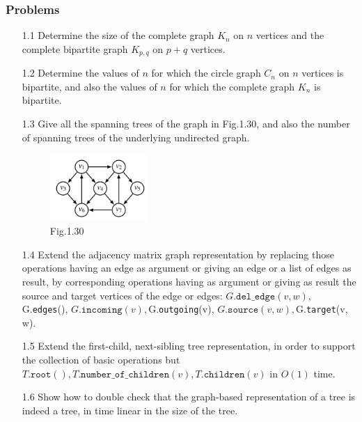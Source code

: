 \documentclass[a4paper,12pt]{article}
\begin{document}
\subsubsection*{Problems}

\begin{enumerate}
    \item[1.1] Determine the size of the complete graph $K_n$ on $n$ vertices and the complete bipartite graph $K_{p,q}$ on $p + q$ vertices.
    
    \item[1.2] Determine the values of $n$ for which the circle graph $C_n$ on $n$ vertices is bipartite, and also the values of $n$ for which the complete graph $K_n$ is bipartite.
    
    \item[1.3] Give all the spanning trees of the graph in Fig.1.30, and also the number of spanning trees of the underlying undirected graph.
    
    \begin{figure}[H]
        \centering
        \includegraphics[width=0.35\textwidth]{fig1_30_graph.png} 
        \caption{Fig.1.30}
        \label{fig:graph1_3}
    \end{figure}
    
    \item[1.4] Extend the adjacency matrix graph representation by replacing those operations having an edge as argument or giving an edge or a list of edges as result, by corresponding operations having as argument or giving as result the source and target vertices of the edge or edges: $G.\texttt{del\_edge}(v, w), $G.\texttt{edges}(), $G.\texttt{incoming}(v), $G.\texttt{outgoing}(v), $G.\texttt{source}(v, w), $G.\texttt{target}(v, w).
    
    \item[1.5] Extend the first-child, next-sibling tree representation, in order to support the collection of basic operations but $T.\texttt{root}(), T.\texttt{number\_of\_children}(v), T.\texttt{children}(v)$ in $O(1)$ time.
    
    \item[1.6] Show how to double check that the graph-based representation of a tree is indeed a tree, in time linear in the size of the tree.
\end{enumerate}
\end{document}
